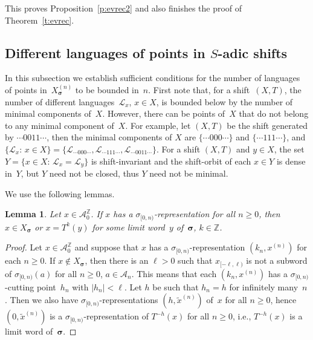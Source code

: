 \documentclass{amsart}
\newtheorem{lemma}{Lemma}[section]
\theoremstyle{definition}
\theoremstyle{remark}
\numberwithin{equation}{section}
\begin{document}
This proves Proposition~\ref{p:evrec2} and also finishes the proof of Theorem~\ref{t:evrec}.

\subsection{Different languages of points in $S$-adic shifts}\label{sec:minimal}
In this subsection we establish sufficient conditions for the number of languages of points in~$X_{\boldsymbol{\sigma}}^{(n)}$ to be bounded in~$n$. 
First note that, for a shift~$(X,T)$, the number of different languages~$\mathcal{L}_x$, $x \in X$, is bounded below by the number of minimal components of~$X$.
However, there can be points of~$X$ that do not belong to any minimal component of~$X$.
For example, let $(X,T)$ be the shift generated by $\cdots 0011\cdots$, then the minimal components of $X$ are $\{\cdots 000\cdots\}$ and $\{\cdots 111\cdots\}$, and $\{\mathcal{L}_x:\, x \in X\} = \{\mathcal{L}_{\cdots 000\cdots}, \mathcal{L}_{\cdots 111\cdots}, \mathcal{L}_{\cdots 0011\cdots}\}$. 
For a shift $(X,T)$ and $y \in X$, the set $Y = \{x \in X:\, \mathcal{L}_x = \mathcal{L}_y\}$ is shift-invariant and the shift-orbit of each $x \in Y$ is dense in~$Y$, but $Y$ need not be closed, thus $Y$ need not be minimal. 

We use the following lemmas.

\begin{lemma} \label{l:Xlimitword}
Let $x \in \mathcal{A}_0^\mathbb{Z}$. 
If $x$ has a $\sigma_{[0,n)}$-representation for all $n\ge0$, then $x \in X_{\boldsymbol{\sigma}}$ or $x = T^k(y)$ for some limit word~$y$ of~$\boldsymbol{\sigma}$, $k \in \mathbb{Z}$.
\end{lemma}

\begin{proof}
Let $x \in \mathcal{A}_0^\mathbb{Z}$ and suppose that $x$ has a $\sigma_{[0,n)}$-representation $(k_n,x^{(n)})$ for each $n\ge0$.
If $x \notin X_{\boldsymbol{\sigma}}$, then there is an $\ell > 0$ such that $x_{[-\ell,\ell)}$ is not a subword of $\sigma_{[0,n)}(a)$ for all $n\ge0$, $a \in \mathcal{A}_n$. 
This means that each $(k_n,x^{(n)})$ has a $\sigma_{[0,n)}$-cutting point~$h_n$ with $|h_n| < \ell$. 
Let $h$ be such that $h_n = h$ for infinitely many~$n$. 
Then we also have $\sigma_{[0,n)}$-representations $(h,\tilde{x}^{(n)})$ of~$x$ for all $n\ge0$, hence $(0,\tilde{x}^{(n)})$ is a $\sigma_{[0,n)}$-representation of $T^{-h}(x)$ for all $n\ge0$, i.e., $T^{-h}(x)$ is a limit word of~$\boldsymbol{\sigma}$. 
\end{proof}
\end{document}
